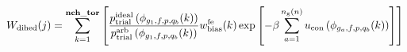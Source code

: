 \documentclass[12pt]{article}
\begin{document}
\begin{displaymath}
W_{\rm dihed}(j) =
\sum_{k=1}^{\bf nch\_tor}
\left[
{
{{p_{\rm trial}^{\rm ideal}\left(\phi_{g_1,f,p,q_b}(k)\right)}\over{ p_{\rm trial}^{\rm arb}\left(\phi_{g_1,f,p,q_b}(k)\right)}}
w_{\rm bias}^{\rm fe}(k)
\exp\left[-\beta \sum_{a=1}^{n_{\rm g}(n)} u_{\rm con}\left(\phi_{g_a,f,p,q_b}(k)\right)\right]
}
\right]
\end{displaymath}
\end{document}
